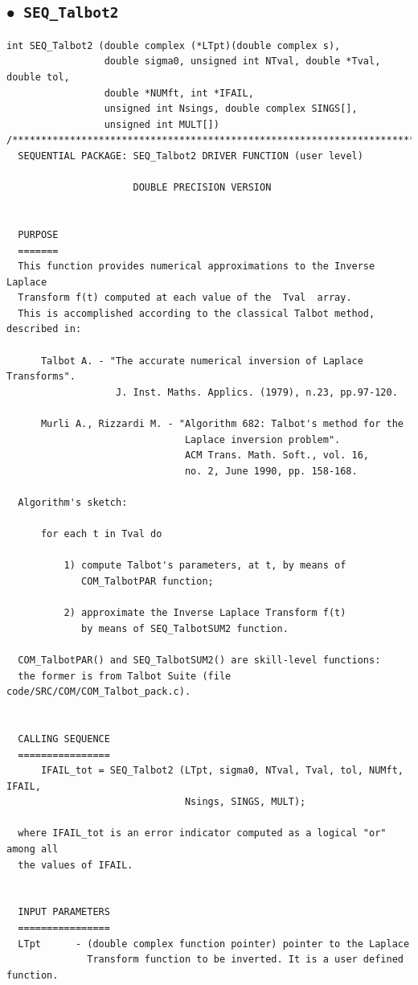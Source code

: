 \documentclass[a4paper,10pt]{report}%
\begin{document}
\subsection{\texorpdfstring{$\boldsymbol{\bullet}$}{ - }{\tt\ SEQ\_Talbot2}}
\begin{lstlisting}
int SEQ_Talbot2 (double complex (*LTpt)(double complex s),
                 double sigma0, unsigned int NTval, double *Tval, double tol,
                 double *NUMft, int *IFAIL,
                 unsigned int Nsings, double complex SINGS[],
                 unsigned int MULT[])
/*****************************************************************************
  SEQUENTIAL PACKAGE: SEQ_Talbot2 DRIVER FUNCTION (user level)

                      DOUBLE PRECISION VERSION


  PURPOSE
  =======
  This function provides numerical approximations to the Inverse Laplace
  Transform f(t) computed at each value of the  Tval  array.
  This is accomplished according to the classical Talbot method, described in:

      Talbot A. - "The accurate numerical inversion of Laplace Transforms".
                   J. Inst. Maths. Applics. (1979), n.23, pp.97-120.

      Murli A., Rizzardi M. - "Algorithm 682: Talbot's method for the
                               Laplace inversion problem".
                               ACM Trans. Math. Soft., vol. 16,
                               no. 2, June 1990, pp. 158-168.

  Algorithm's sketch:

      for each t in Tval do

          1) compute Talbot's parameters, at t, by means of
             COM_TalbotPAR function;

          2) approximate the Inverse Laplace Transform f(t)
             by means of SEQ_TalbotSUM2 function.

  COM_TalbotPAR() and SEQ_TalbotSUM2() are skill-level functions:
  the former is from Talbot Suite (file code/SRC/COM/COM_Talbot_pack.c).


  CALLING SEQUENCE
  ================
      IFAIL_tot = SEQ_Talbot2 (LTpt, sigma0, NTval, Tval, tol, NUMft, IFAIL,
                               Nsings, SINGS, MULT);

  where IFAIL_tot is an error indicator computed as a logical "or" among all
  the values of IFAIL.


  INPUT PARAMETERS
  ================
  LTpt      - (double complex function pointer) pointer to the Laplace
              Transform function to be inverted. It is a user defined function.


\end{lstlisting}
\end{document}
